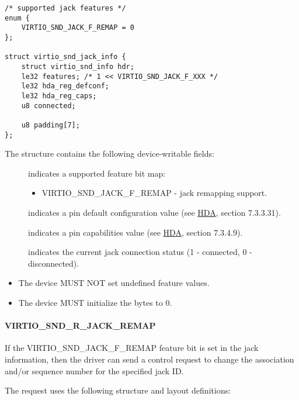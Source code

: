 \begin{lstlisting}
/* supported jack features */
enum {
    VIRTIO_SND_JACK_F_REMAP = 0
};

struct virtio_snd_jack_info {
    struct virtio_snd_info hdr;
    le32 features; /* 1 << VIRTIO_SND_JACK_F_XXX */
    le32 hda_reg_defconf;
    le32 hda_reg_caps;
    u8 connected;

    u8 padding[7];
};
\end{lstlisting}

The structure contains the following device-writable fields:

\begin{description}
\item[] indicates a supported feature bit map:
\begin{itemize}
\item VIRTIO_SND_JACK_F_REMAP - jack remapping support.
\end{itemize}
\item[] indicates a pin default configuration value
(see \hyperref[intro:HDA]{HDA}, section 7.3.3.31).
\item[] indicates a pin capabilities value
(see \hyperref[intro:HDA]{HDA}, section 7.3.4.9).
\item[] indicates the current jack connection status
(1 - connected, 0 - disconnected).
\end{description}


\begin{itemize}
\item The device MUST NOT set undefined feature values.
\item The device MUST initialize the  bytes to 0.
\end{itemize}

\paragraph{VIRTIO_SND_R_JACK_REMAP}

If the VIRTIO_SND_JACK_F_REMAP feature bit is set in the jack information,
then the driver can send a control request to change the association and/or
sequence number for the specified jack ID.

The request uses the following structure and layout definitions:

